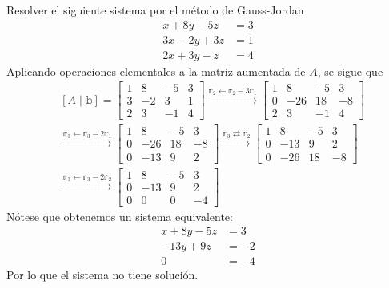 \begin{example}
    Resolver el siguiente sistema por el método de Gauss-Jordan
    \begin{align*}
        x+8y-5z &=3\\
        3x-2y+3z &=1\\
        2x+3y-z &=4
    \end{align*}
    \solucion Aplicando operaciones elementales a la matriz aumentada de $A$, se sigue que
    \begin{align*}
        & [A \mid \mathbb{b}] = \left[ \begin{array}{rrr|r}
            1 & 8 & -5 & 3\\
            3 & -2 & 3 & 1 \\
            2 & 3 & -1 & 4
        \end{array} \right] \xrightarrow{\mathbb{r}_2 \leftarrow \mathbb{r}_2 -3\mathbb{r}_1} \left[ \begin{array}{rrr|r}
            1 & 8 & -5 & 3\\
            0 & -26 & 18 & -8 \\
            2 & 3 & -1 & 4
        \end{array} \right] \\
        & \xrightarrow{\mathbb{r}_3 \leftarrow \mathbb{r}_3 -2\mathbb{r}_1} \left[ \begin{array}{rrr|r}
            1 & 8 & -5 & 3\\
            0 & -26 & 18 & -8 \\
            0 & -13 & 9 & 2
        \end{array} \right] \xrightarrow{\mathbb{r}_3 \rightleftarrows \mathbb{r}_2} \left[ \begin{array}{rrr|r}
            1 & 8 & -5 & 3\\
            0 & -13 & 9 & 2 \\
            0 & -26 & 18 & -8
        \end{array} \right] \\
        & \xrightarrow{\mathbb{r}_3 \leftarrow \mathbb{r}_3 -2\mathbb{r}_2} \left[ \begin{array}{rrr|r}
            1 & 8 & -5 & 3 \\
            0 & -13 & 9 & 2 \\
            0 & 0 & 0 & -4
        \end{array} \right]
    \end{align*}
    Nótese que obtenemos un sistema equivalente:
    \begin{align*}
        x+8y-5z & = 3\\
        -13y+9z & = -2\\
        0 & = -4
    \end{align*}
    Por lo que el sistema no tiene solución.
\end{example}

